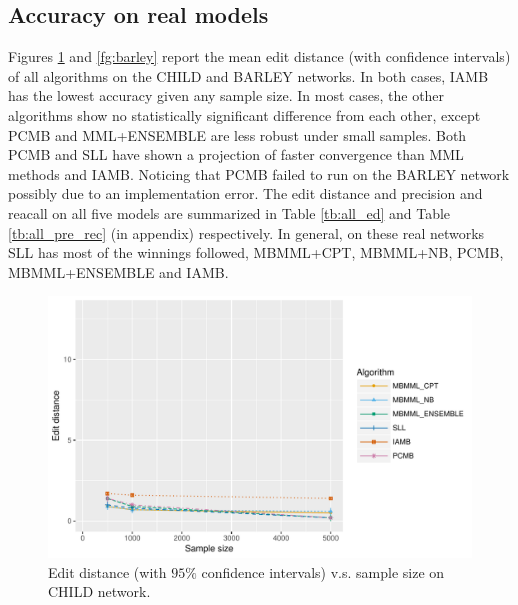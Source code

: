 \subsection{Accuracy on real models}
\label{sec:exp_real}
Figures \ref{fg:child} and \ref{fg:barley} report the mean edit distance (with confidence intervals) of all algorithms on the CHILD and BARLEY networks. In both cases, IAMB has the lowest accuracy given any sample size. In most cases, the other algorithms show no statistically significant difference from each other, except PCMB and MML+ENSEMBLE are less robust under small samples. Both PCMB and SLL have shown a projection of faster convergence than MML methods and IAMB. Noticing that PCMB failed to run on the BARLEY network possibly due to an implementation error. The edit distance and precision and reacall on all five models are summarized in Table \ref{tb:all_ed} and Table \ref{tb:all_pre_rec} (in appendix) respectively. In general, on these real networks SLL has most of the winnings followed, MBMML+CPT, MBMML+NB, PCMB, MBMML+ENSEMBLE and IAMB. 
\begin{figure}[H]
  \centering
    \includegraphics[scale=0.6]{figures/ed_vs_samplesize_child.pdf}
  \caption{Edit distance (with $95\%$ confidence intervals) v.s. sample size on CHILD network.}
  \label{fg:child}
\end{figure}

